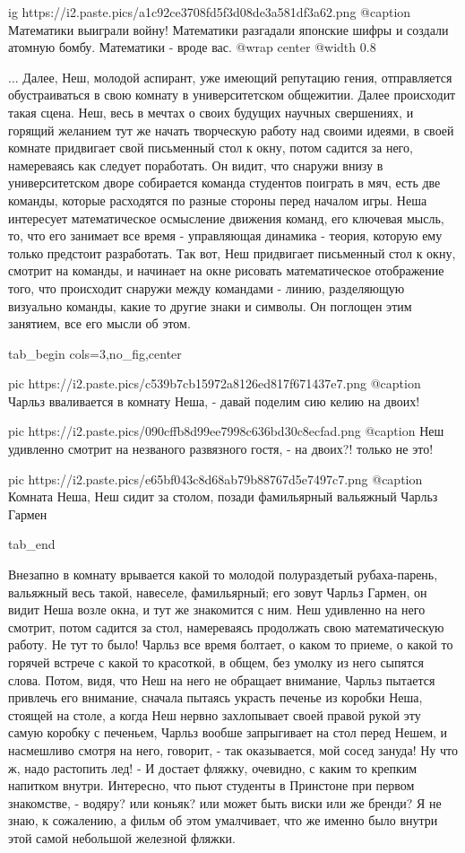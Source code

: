 \ifcmt
  ig https://i2.paste.pics/a1c92ce3708fd5f3d08de3a581df3a62.png
  @caption Математики выиграли войну! Математики разгадали японские шифры и создали атомную бомбу. Математики - вроде вас.
  @wrap center
  @width 0.8
\fi

... Далее, Неш, молодой аспирант, уже имеющий репутацию гения, отправляется
обустраиваться в свою комнату в университетском общежитии. Далее происходит
такая сцена. Неш, весь в мечтах о своих будущих научных свершениях, и горящий
желанием тут же начать творческую работу над своими идеями, в своей комнате
придвигает свой письменный стол к окну, потом садится за него, намереваясь как
следует поработать.  Он видит, что снаружи внизу в университетском дворе
собирается команда студентов поиграть в мяч, есть две команды, которые
расходятся по разные стороны перед началом игры. Неша интересует математическое
осмысление движения команд, его ключевая мысль, то, что его занимает все время
- управляющая динамика - теория, которую ему только предстоит разработать.  Так
вот, Неш придвигает письменный стол к окну, смотрит на команды, и начинает на
окне рисовать математическое отображение того, что происходит снаружи между
командами - линию, разделяющую визуально команды, какие то другие знаки и
символы.  Он поглощен этим занятием, все его мысли об этом. 

\ifcmt
  tab_begin cols=3,no_fig,center

		 pic https://i2.paste.pics/c539b7cb15972a8126ed817f671437e7.png
		 @caption Чарльз вваливается в комнату Неша, - давай поделим сию келию на двоих!

		 pic https://i2.paste.pics/090cffb8d99ee7998c636bd30c8ecfad.png
		 @caption Неш удивленно смотрит на незваного развязного гостя, - на двоих?! только не это!

     pic https://i2.paste.pics/e65bf043c8d68ab79b88767d5e7497c7.png
		 @caption Комната Неша, Неш сидит за столом, позади фамильярный вальяжный Чарльз Гармен

  tab_end
\fi

Внезапно в комнату
врывается какой то молодой полураздетый рубаха-парень, вальяжный весь такой,
навеселе, фамильярный; его зовут Чарльз Гармен, он видит Неша возле окна, и тут
же знакомится с ним.  Неш удивленно на него смотрит, потом садится за стол,
намереваясь продолжать свою математическую работу. Не тут то было!  Чарльз все
время болтает, о каком то приеме, о какой то горячей встрече с какой то
красоткой, в общем, без умолку из него сыпятся слова.  Потом, видя, что Неш на
него не обращает внимание, Чарльз пытается привлечь его внимание, сначала
пытаясь украсть печенье из коробки Неша, стоящей на столе, а когда Неш нервно
захлопывает своей правой рукой эту самую коробку с печеньем, Чарльз вообше
запрыгивает на стол перед Нешем, и насмешливо смотря на него, говорит, - так
оказывается, мой сосед зануда! Ну что ж, надо растопить лед! - И достает
фляжку, очевидно, с каким то крепким напитком внутри.  Интересно, что пьют
студенты в Принстоне при первом знакомстве, - водяру? или коньяк? или может
быть виски или же бренди?  Я не знаю, к сожалению, а фильм об этом умалчивает,
что же именно было внутри этой самой небольшой железной фляжки. 

